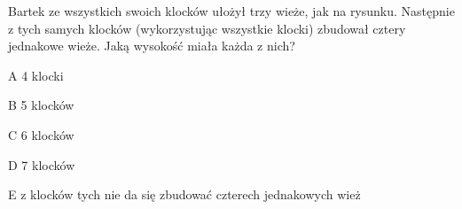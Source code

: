 \begin{tresc}
Bartek ze wszystkich swoich klocków ułożył trzy wieże, jak na rysunku. Następnie z tych samych klocków (wykorzystując wszystkie klocki) zbudował cztery jednakowe wieże. Jaką wysokość miała każda z nich?
\end{tresc}
\begin{wariant}{A} 4 klocki \end{wariant}
\begin{wariant}{B} 5 klocków \end{wariant}
\begin{wariant}{C} 6 klocków \end{wariant}
\begin{wariant}{D} 7 klocków \end{wariant}
\begin{wariant}{E} z klocków tych nie da się zbudować czterech jednakowych wież \end{wariant}
